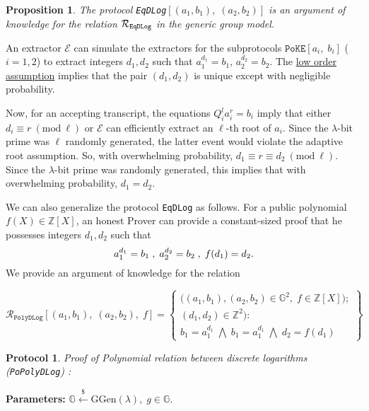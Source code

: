 \documentclass[11pt, lettersize, notitlepage, leqno, footskip=0.6cm]{article}
\newcommand{\bz}{\mathbb Z}
\newcommand{\ttt}{\texttt}
\newcommand{\mc}{\mathcal}
\newcommand{\mb}{\mathbb}
\newcommand{\mr}{\mathrm}
\newcommand{\lam}{\lambda}
\newcommand{\lamb}{\lambda}
\newcommand{\vs}{\vspace{-0.15cm}}
\newcommand{\noin}{\noindent}
\newcommand{\op}{overwhelming probability}
\newcommand{\np}{negligible probability}
\newcommand{\Mod}[1]{\ (\mathrm{mod}\ #1)}
\newcommand{\E}{\mc{E}}
\newtheorem{Prop}[Thm]{Proposition}
\newtheorem{Prot}[Thm]{Protocol}
\numberwithin{equation}{section}
\begin{document}
\begin{Prop} The protocol \verb|EqDLog|$[(a_1, b_1),\; (a_2, b_2)]$ is an argument of knowledge for the relation $\mc{R}_{{\tt{{EqDLog}}}}$ in the generic group model.\end{Prop}

\begin{prf} An extractor $\E$ can simulate the extractors for the subprotocols $\ttt{PoKE}[a_i,\;b_i]$ ($i=1,2$) to extract integers $d_1,d_2$ such that $a_1^{d_1} = b_1$, $a_2^{d_2} = b_2$. The \hyperlink{low order}{low order assumption} implies that the pair $(d_1,d_2)$ is unique except with \np. 

Now, for an accepting transcript, the equations $Q_i^{l}a_i^{r} = b_i$ imply that either $d_i\equiv r\Mod{\ell}$ or $\E$ can efficiently extract an $\ell$-th root of $a_i$. Since the $\lam$-bit prime was $\ell$ randomly generated, the latter event would violate the adaptive root assumption. So, with \op, $d_1\equiv r\equiv d_2\Mod{\ell}$. Since the $\lam$-bit prime was randomly generated, this implies that with \op, $d_1 = d_2$.\end{prf}

\vspace{0.2cm}



\noin We can also generalize the protocol \verb|EqDLog| as follows. For a public polynomial {$f(X)\in \bz[X]$}, an honest Prover can provide a constant-sized proof that he possesses integers $d_1,d_2$ such that \vs $$a_1^{d_1} = b_1\;,\;a_2^{d_2} = b_2\;,\;f(d_1) = d_2. \vs $$ We provide an argument of knowledge for the relation 

\[
  \mc{R}_{{\ttt{PolyDLog}}}[(a_1, b_1),\;(a_2,b_2),\;f] = \left\{\begin{array}{l}
    \big((a_1, b_1), (a_2,b_2)\in\mb{G}^2,\;f\in\bz[X]\big);\\
    (d_1, d_2)\in\mb{Z}^2): \\
    b_1 = a_1^{d_1}\; \bigwedge\; b_1 = a_1^{d_1}\; \bigwedge \;d_2 = f(d_1)
  \end{array}\right\}
\] 

\vspace{0.1cm}


\begin{Prot} \normalfont \textit{Proof of Polynomial relation between discrete logarithms} (\verb|PoPolyDLog|) :\end{Prot} \vspace{-0.3cm}

\noin \textbf{Parameters:} $\mb{G}\xleftarrow{\$} \mr{GGen}(\lamb), \; g\in \mb{G}$.
\end{document}
